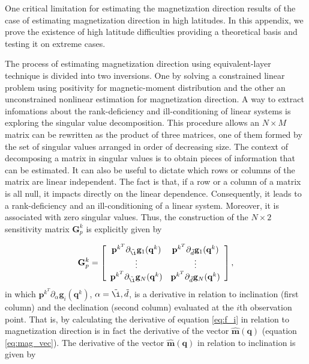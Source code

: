 
One critical limitation for estimating the magnetization direction results of the case of estimating magnetization direction in high latitudes. In this appendix, we prove the existence of high latitude difficulties providing a theoretical basis and testing it on extreme cases.

The process of estimating magnetization direction using equivalent-layer technique is divided into two inversions. One by solving a constrained linear problem using positivity for magnetic-moment distribution and the other an unconstrained nonlinear estimation for magnetization direction. A way to extract infomations about the rank-deficiency and ill-conditioning of linear systems is exploring the singular value decomposition. This procedure allows an $N \times M$ matrix can be rewritten as the product of three matrices, one of them formed by the set of singular values arranged in order of decreasing size. The context of decomposing a matrix in singular values is to obtain pieces of information that can be estimated. It can also be useful to dictate which rows or columns of the matrix are linear independent. The fact is that, if a row or a column of a matrix is all null, it impacts directly on the linear dependence. Consequently, it leads to a rank-deficiency and an ill-conditioning of a linear system. Moreover, it is associated with zero singular values. Thus, the construction of the $N \times 2$ sensitivity matrix $\mathbf{G}_{p}^{k}$ is explicitly given by

\begin{equation}
\mathbf{G}_{p}^{k} =
\left[ \begin{array}{cc}
\mathbf{p}^{k^T} \partial_{\tilde{\i}} \mathbf{g}_{1} (\mathbf{q}^k) & \mathbf{p}^{k^T} \partial_{\tilde{d}} \mathbf{g}_{1}(\mathbf{q}^k) \\
\vdots & \vdots  \\
\mathbf{p}^{k^T} \partial_{\tilde{\i}} \mathbf{g}_{N} (\mathbf{q}^k) & \mathbf{p}^{k^T} \partial_{\tilde{d}} \mathbf{g}_{N} (\mathbf{q}^k)
\end{array} \right] ,
\label{eq:gp}
\end{equation}
in which $\mathbf{p}^{k^T} \partial_{\alpha} \mathbf{g}_{i} (\mathbf{q}^k)$, $\alpha =\tilde{\i}, \tilde{d}$, is a derivative in relation to inclination (first column) and the declination (second column) evaluated at the $i$th observation point. That is, by calculating the derivative of equation \ref{eq:f_i} in relation to magnetization direction is in fact the derivative of the vector $\hat{\mathbf{m}}(\mathbf{q})$ (equation \ref{eq:mag_vec}). The derivative of the vector $\hat{\mathbf{m}}(\mathbf{q})$ in relation to inclination is given by

